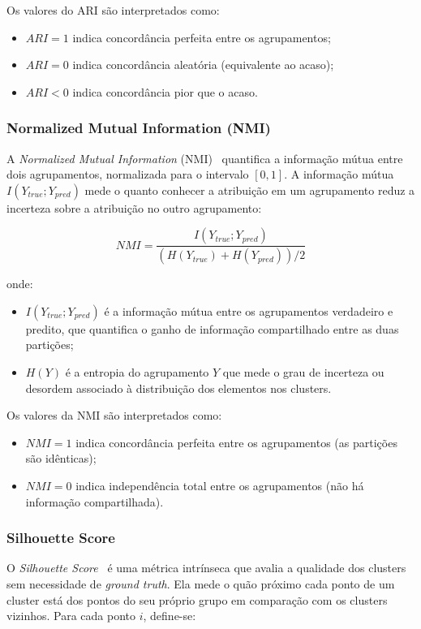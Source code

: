 Os valores do ARI são interpretados como:
\begin{itemize}
    \item $ARI = 1$ indica concordância perfeita entre os agrupamentos;
    \item $ARI = 0$ indica concordância aleatória (equivalente ao acaso);
    \item $ARI < 0$ indica concordância pior que o acaso.
\end{itemize}

\subsubsection{Normalized Mutual Information (NMI)}

A \textit{Normalized Mutual Information} (NMI)~\cite{strehl2002cluster} quantifica a informação mútua entre dois agrupamentos, normalizada para o intervalo $[0, 1]$. A informação mútua $I(Y_{true}; Y_{pred})$ mede o quanto conhecer a atribuição em um agrupamento reduz a incerteza sobre a atribuição no outro agrupamento:

\[
NMI = \frac{I(Y_{true}; Y_{pred})}{(H(Y_{true}) + H(Y_{pred}))/2}
\]

onde:
\begin{itemize}
\item $I(Y_{true}; Y_{pred})$ é a informação mútua entre os agrupamentos verdadeiro e predito, que quantifica o ganho de informação compartilhado entre as duas partições;

\item $H(Y)$ é a entropia do agrupamento $Y$ que mede o grau de incerteza ou desordem associado à distribuição dos elementos nos clusters.
\end{itemize}

Os valores da NMI são interpretados como:
\begin{itemize}
\item $NMI = 1$ indica concordância perfeita entre os agrupamentos (as partições são idênticas);
\item $NMI = 0$ indica independência total entre os agrupamentos (não há informação compartilhada).
\end{itemize}

\subsubsection{Silhouette Score}

O \textit{Silhouette Score}~\cite{rousseeuw1987silhouettes} é uma métrica intrínseca que avalia a qualidade dos clusters sem necessidade de \textit{ground truth}. Ela mede o quão próximo cada ponto de um cluster está dos pontos do seu próprio grupo em comparação com os clusters vizinhos. Para cada ponto $i$, define-se:

